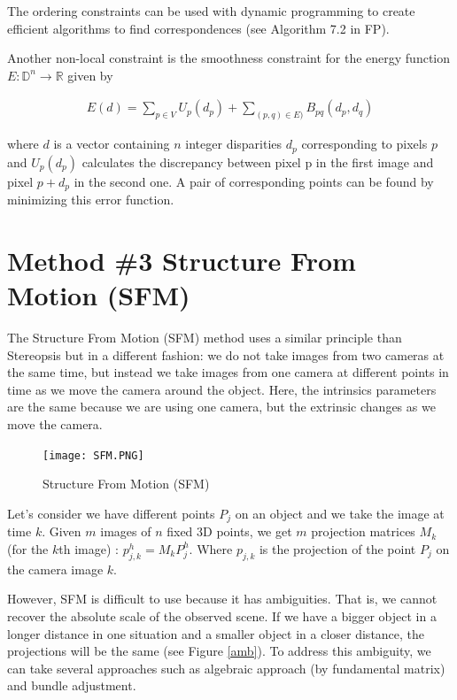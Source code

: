 \documentclass[twoside]{article}
\begin{document}
The ordering constraints can be used with dynamic programming to create efficient algorithms to find correspondences (see Algorithm 7.2 in FP). 

Another non-local constraint is the smoothness constraint for the energy function $E:\mathbb{D}^n \rightarrow \mathbb{R}$ given by

\begin{align}
E(d) = \sum_{p \in V} U_p(d_p) + \sum_{(p,q) \in E)} B_{pq}(d_p,d_q)
\end{align}

where $d$ is a vector containing $n$ integer disparities $d_p$ corresponding to pixels $p$ and $U_p(d_p)$ calculates the discrepancy between pixel p in the first image and pixel $p+d_p$ in the second one. A pair of corresponding points can be found by minimizing this error function. 


\newpage
\section{Method \#3 Structure From Motion (SFM)}

The Structure From Motion (SFM) method uses a similar principle than Stereopsis but in a different fashion: we do not take images from two cameras at the same time, but instead we take images from one camera at different points in time as we move the camera around the object. Here, the intrinsics parameters are the same because we are using one camera, but the extrinsic changes as we move the camera.

\begin{figure}[h!]
  \begin{center}
	\texttt{[image: SFM.PNG]}  \end{center}
  \caption{Structure From Motion (SFM)}
  \label{ex}
\end{figure}

Let's consider we have different points $P_j$ on an object and we take the image at time $k$. Given $m$ images of $n$ fixed 3D points, we get $m$ projection matrices $M_k$ (for the $k$th image) : $p_{j,k}^h = M_k P_j^h$.
Where $p_{j,k}$ is the projection of the point $P_j$ on the camera image $k$.

However, SFM is difficult to use because it has ambiguities. That is, we cannot recover the absolute scale of the observed scene. If we have a bigger object in a longer distance in one situation and a smaller object in a closer distance, the projections will be the same (see Figure \ref{amb}). To address this ambiguity, we can take several approaches such as algebraic approach (by fundamental matrix) and bundle adjustment.
\end{document}
